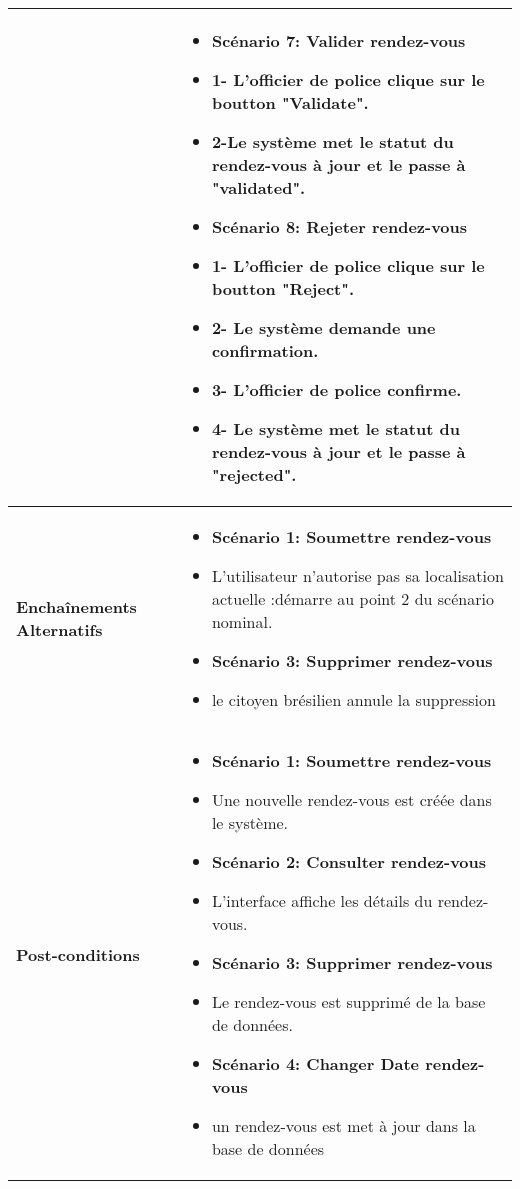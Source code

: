 \begin{longtable}{|>{\arraybackslash}p{4.2cm}|>{\arraybackslash}p{12.5cm}|}
\hline
\textbf{}&
\begin{itemize}[label=]
    \item\textbf{Scénario 7: Valider rendez-vous }
    \item 1- L'officier de police clique sur le boutton "Validate".
    \item 2-Le système met le statut du rendez-vous à jour et le passe à "validated".
    \item\textbf{Scénario 8: Rejeter rendez-vous }
    \item 1- L'officier de police clique sur le boutton "Reject".
    \item 2- Le système demande une confirmation.
    \item 3- L'officier de police confirme.
    \item 4- Le système met le statut du rendez-vous à jour et le passe à "rejected".
\end{itemize}\\
\hline
\textbf{Enchaînements Alternatifs} &
\begin{itemize}[label=]
 \item\textbf{Scénario 1: Soumettre rendez-vous}
 \item L'utilisateur n'autorise pas sa localisation actuelle :démarre au point 2 du scénario nominal.
  \item\textbf{Scénario 3: Supprimer rendez-vous}
  \item le citoyen brésilien annule la suppression
\end{itemize} \\
\hline
\textbf{Post-conditions} &
\begin{itemize}[label=]
\item\textbf{Scénario 1: Soumettre rendez-vous}
\item Une nouvelle rendez-vous est créée dans le système.
\item\textbf{Scénario 2: Consulter rendez-vous}
\item L'interface affiche les détails du rendez-vous.
\item\textbf{Scénario 3: Supprimer rendez-vous }
\item Le rendez-vous est supprimé de la base de données.
\item\textbf{Scénario 4: Changer Date rendez-vous }
\item un rendez-vous est met à jour dans la base de données
\end{itemize} \\






\end{longtable}
